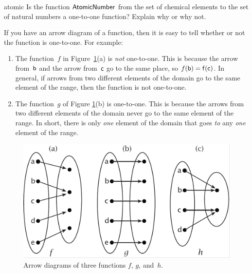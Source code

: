 \begin{exercise}{atomic}
Is the function $\sf{Atomic Number}$ from the set of chemical elements to the set of natural numbers a one-to-one function?  Explain why or why not.
\end{exercise}

\begin{rem}
If you have an arrow diagram of a function, then it is easy to tell whether or not the function is one-to-one. For example:

\begin{enumerate}
\item The function~$f$ in Figure~\ref{arrow11}(a) is \emph{not} one-to-one. This is because the arrow from~$\sf{b}$ and the arrow from~$\sf{c}$ go to the same place, so $f(\sf{b}) = f(\sf{c})$. In general, if arrows from two different elements of the domain go to the same element of the range, then the function is not one-to-one. 
\item The function~$g$ of Figure \ref{arrow11}(b) is one-to-one. This is because the arrows from two different elements of the domain never go to the same element of the range.  In short, there is only \emph{one} element of the domain that goes \emph{to} any \emph{one} element of the range.  
\end{enumerate}
\end{rem}
\begin{figure}[h]
\includegraphics{images/arrow11.png}
\caption{Arrow diagrams of three functions $f$, $g$, and~$h$.}
\label{arrow11}
\end{figure}

